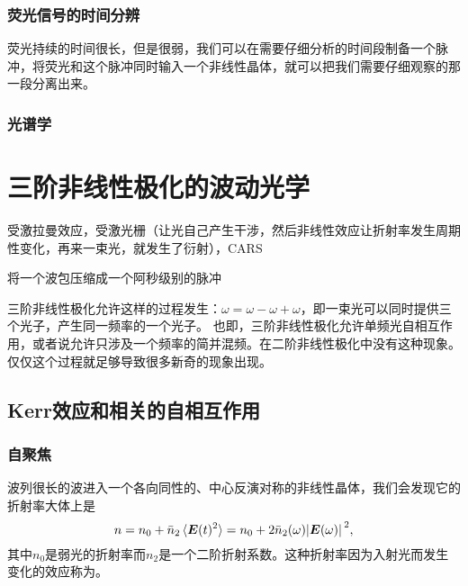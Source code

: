 \subsubsection{荧光信号的时间分辨}

荧光持续的时间很长，但是很弱，我们可以在需要仔细分析的时间段制备一个脉冲，将荧光和这个脉冲同时输入一个非线性晶体，就可以把我们需要仔细观察的那一段分离出来。

\subsubsection{光谱学}

\section{三阶非线性极化的波动光学}

受激拉曼效应，受激光栅（让光自己产生干涉，然后非线性效应让折射率发生周期性变化，再来一束光，就发生了衍射），CARS

将一个波包压缩成一个阿秒级别的脉冲

三阶非线性极化允许这样的过程发生：$\omega = \omega - \omega + \omega$，即一束光可以同时提供三个光子，产生同一频率的一个光子。
也即，三阶非线性极化允许单频光自相互作用，或者说允许只涉及一个频率的简并混频。在二阶非线性极化中没有这种现象。
仅仅这个过程就足够导致很多新奇的现象出现。

\subsection{Kerr效应和相关的自相互作用}

\subsubsection{自聚焦}

波列很长的波进入一个各向同性的、中心反演对称的非线性晶体，我们会发现它的折射率大体上是
\begin{equation}
    n = n_0 + \bar{n}_2 \expval*{\vb*{E}(t)^2} = n_0 + 2 \bar{n}_2(\omega) \abs*{\vb*{E}(\omega)}^2,
    \label{eq:ref-index-change}
\end{equation}
其中$n_0$是弱光的折射率而$n_2$是一个二阶折射系数。这种折射率因为入射光而发生变化的效应称为。

